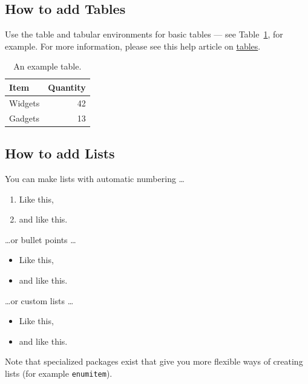 \documentclass[12pt,a4paper,faculty=eb,language=en,doctype=article]{ugent-doc}
\begin{document}

\subsection{How to add Tables}

Use the table and tabular environments for basic tables --- see Table~\ref{tab:widgets}, for example.
For more information, please see this help article on \href{https://www.overleaf.com/learn/latex/tables}{tables}. 

\begin{table}[h]
\centering
    \begin{tabular}{l|r}
        Item & Quantity \\\hline
        Widgets & 42 \\
        Gadgets & 13
    \end{tabular}
    \caption{\label{tab:widgets}An example table.}
\end{table}


\subsection{How to add Lists}

You can make lists with automatic numbering \dots

\begin{enumerate}
    \item Like this,
    \item and like this.
\end{enumerate}
\dots or bullet points \dots
\begin{itemize}
    \item Like this,
    \item and like this.
\end{itemize}
\dots or custom lists \dots
\begin{itemize}
    \item[a.] Like this,
    \item[b.] and like this.
\end{itemize}

Note that specialized packages exist that give you more flexible ways of creating lists (for example \verb|enumitem|). 

\end{document}
